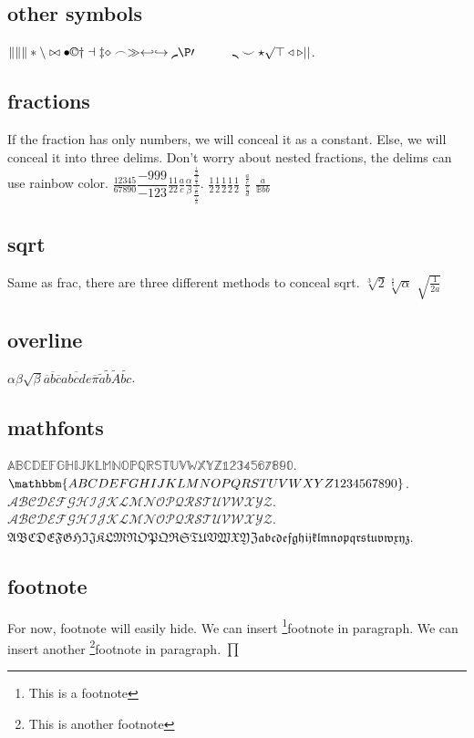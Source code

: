 \documentclass{ctexbook}
\begin{document}
\subsection{other symbols}
\(\| \lVert \rVert \ast \backslash \bowtie \bullet \copyright \dagger \dashv \ddagger \diamond \frown \gg \hookleftarrow \hookrightarrow \lmoustache \P \prime \quad \qquad \rmoustache \smile \star \surd \top \triangleleft \triangleright \lvert \rvert \).

\subsection{fractions}
If the fraction has only numbers, we will conceal it as a constant.
Else, we will conceal it into three delims. Don't worry about nested fractions, the delims can use rainbow color.
\(\frac{12345}{67890} \dfrac{-999}{-123} \tfrac{11}{22} \frac{a}{c} \frac{\alpha}{\beta} \frac{\frac{\frac{1}{2}}{\frac{3}{4}}}{\frac{\frac{5}{6}}{\frac{7}{8}}}\).
\(\frac {1}2 \frac {1} 2 \frac 1 2 \frac 12 \frac12\)
\( \frac{\frac{a}{c}}{\frac{c}{d}}\)
\(\frac{a}{\mathbb{B}bb}\)
\subsection{sqrt}
Same as frac, there are three different methods to conceal sqrt.
\(\sqrt[3]{2} \sqrt[\frac{a}{b}]{\alpha}\)
\(\sqrt{\frac{1}{2a}}\)
\subsection{overline}
\(\alpha \beta \sqrt{\beta} \overline{a} \overline{b} \overline{c} \overline{abcde}  \overline{\pi} \tilde{a} \tilde{b} \tilde{A} \tilde{bc} \).

\subsection{mathfonts}
\(\mathbb{ABCDEFGHIJKLMNOPQRSTUVWXYZ1234567890} \).
\(\mathbbm{ABCDEFGHIJKLMNOPQRSTUVWXYZ1234567890} \).
\(\mathcal{ABCDEFGHIJKLMNOPQRSTUVWXYZ}\).
\(\mathscr{ABCDEFGHIJKLMNOPQRSTUVWXYZ}\).
\(\mathfrak{ABCDEFGHIJKLMNOPQRSTUVWXYZabcdefghijklmnopqrstuvwxyz}\).

\subsection{footnote}
For now, footnote will easily hide.
We can insert \footnote{This is a footnote}{footnote} in paragraph.
We can insert another \footnote{This is another footnote}{footnote} in paragraph.
\(\prod\)
\end{document}
